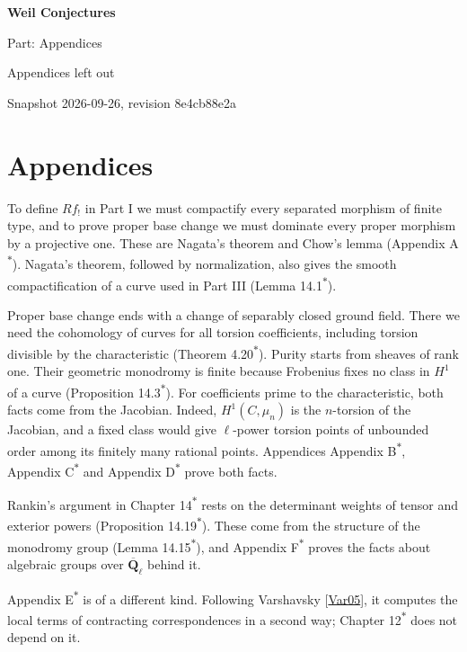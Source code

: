 \documentclass[11pt]{article}
\newcommand{\bpout}[1]{#1\textsuperscript{\hyperlink{bp-outside}{\ensuremath{\ast}}}}
\begin{document}
\pagestyle{plain}
\begin{center}
{\LARGE\bfseries Weil Conjectures\par}
\vspace{0.7em}
{\large Part: Appendices\par}
\vspace{0.5em}
{\small\color{bpmuted}Appendices left out\par}
{\small\color{bpmuted}Snapshot 2026-09-26, revision 8e4cb88e2a\par}
\end{center}
\bigskip

\part*{\texorpdfstring{Appendices}{Appendices}}
\label{bp1}%
\label{bp2}%
To define \(Rf_!\) in Part I we must compactify every separated morphism of finite type, and to prove proper base change we must dominate every proper morphism by a projective one. These are Nagata's theorem and Chow's lemma (Appendix \bpout{A}). Nagata's theorem, followed by normalization, also gives the smooth compactification of a curve used in Part III (Lemma \bpout{14.1}).

Proper base change ends with a change of separably closed ground field. There we need the cohomology of curves for all torsion coefficients, including torsion divisible by the characteristic (Theorem \bpout{4.20}). Purity starts from sheaves of rank one. Their geometric monodromy is finite because Frobenius fixes no class in \(H^1\) of a curve (Proposition \bpout{14.3}). For coefficients prime to the characteristic, both facts come from the Jacobian. Indeed, \(H^1(C,\mu_n)\) is the \(n\)-torsion of the Jacobian, and a fixed class would give \(\ell\)-power torsion points of unbounded order among its finitely many rational points. Appendices \bpout{Appendix B}, \bpout{Appendix C} and \bpout{Appendix D} prove both facts.

Rankin's argument in Chapter \bpout{14} rests on the determinant weights of tensor and exterior powers (Proposition \bpout{14.19}). These come from the structure of the monodromy group (Lemma \bpout{14.15}), and Appendix \bpout{F} proves the facts about algebraic groups over \(\overline{\mathbf Q}_\ell\) behind it.

Appendix \bpout{E} is of a different kind. Following Varshavsky [\hyperref[bp3]{Var05}], it computes the local terms of contracting correspondences in a second way; Chapter \bpout{12} does not depend on it.
\end{document}
